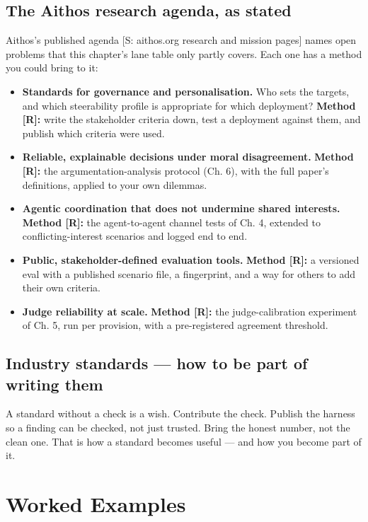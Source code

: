 \subsection{The Aithos research agenda, as stated}
Aithos's published agenda [S: aithos.org research and mission pages] names open problems that this chapter's lane table only partly covers. Each one has a method you could bring to it:
\begin{itemize}
\item \textbf{Standards for governance and personalisation.} Who sets the targets, and which steerability profile is appropriate for which deployment? \textbf{Method [R]:} write the stakeholder criteria down, test a deployment against them, and publish which criteria were used.
\item \textbf{Reliable, explainable decisions under moral disagreement.} \textbf{Method [R]:} the argumentation-analysis protocol (Ch. 6), with the full paper's definitions, applied to your own dilemmas.
\item \textbf{Agentic coordination that does not undermine shared interests.} \textbf{Method [R]:} the agent-to-agent channel tests of Ch. 4, extended to conflicting-interest scenarios and logged end to end.
\item \textbf{Public, stakeholder-defined evaluation tools.} \textbf{Method [R]:} a versioned eval with a published scenario file, a fingerprint, and a way for others to add their own criteria.
\item \textbf{Judge reliability at scale.} \textbf{Method [R]:} the judge-calibration experiment of Ch. 5, run per provision, with a pre-registered agreement threshold.
\end{itemize}

\subsection{Industry standards — how to be part of writing them}
A standard without a check is a wish. Contribute the check. Publish the harness so a finding can be checked, not just trusted. Bring the honest number, not the clean one. That is how a standard becomes useful — and how you become part of it.

\section{Worked Examples}
\tierP

